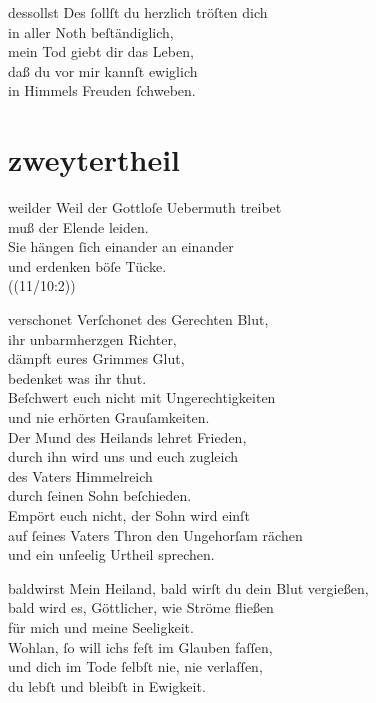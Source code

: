 \documentclass[tocstyle=ref-genre]{ees}
\begin{document}
{  \begin{movement}{dessollst}
    \voice[Coro]
    Des ſollſt du herzlich tröſten dich\\
    in aller Noth beſtändiglich,\\
    mein Tod giebt dir das Leben,\\
    daß du vor mir kannſt ewiglich\\
    in Himmels Freuden ſchweben.
  \end{movement}

  \part{zweytertheil}

  \begin{movement}{weilder}
    \voice[Coro]
    Weil der Gottloſe Uebermuth treibet\\
    muß der Elende leiden.\\
    Sie hängen ſich einander an einander\\
    und erdenken böſe Tücke.\\
    ((11/10:2))
  \end{movement}

  \begin{movement}{verschonet}
    \voice[Soprano]
    Verſchonet des Gerechten Blut,\\
    ihr unbarmherzgen Richter,\\
    dämpft eures Grimmes Glut,\\
    bedenket was ihr thut.\\
    Beſchwert euch nicht mit Ungerechtigkeiten\\
    und nie erhörten Grauſamkeiten.\\
    Der Mund des Heilands lehret Frieden,\\
    durch ihn wird uns und euch zugleich\\
    des Vaters Himmelreich\\
    durch ſeinen Sohn beſchieden.\\
    Empört euch nicht, der Sohn wird einſt\\
    auf ſeines Vaters Thron den Ungehorſam rächen\\
    und ein unſeelig Urtheil sprechen.
  \end{movement}

  \begin{movement}{baldwirst}
    \voice[Soprano]
    Mein Heiland, bald wirſt du dein Blut vergießen,\\
    bald wird es, Göttlicher, wie Ströme fließen\\
    für mich und meine Seeligkeit.\\[1ex]
    Wohlan, ſo will ichs feſt im Glauben faſſen,\\
    und dich im Tode ſelbſt nie, nie verlaſſen,\\
    du lebſt und bleibſt in Ewigkeit.
  \end{movement}

}
\end{document}
